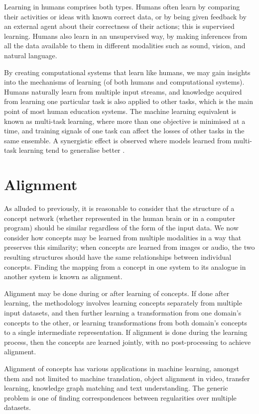 Learning in humans comprises both types. Humans often learn by comparing their activities or ideas with known correct data, or by being given feedback by an external agent about their correctness of their actions; this is supervised learning. Humans also learn in an unsupervised way, by making inferences from all the data available to them in different modalities such as sound, vision, and natural language. 

By creating computational systems that learn like humans, we may gain insights into the mechanisms of learning (of both humans and computational systems). Humans naturally learn from multiple input streams, and knowledge acquired from learning one particular task is also applied to other tasks, which is the main point of most human education systems. The machine learning equivalent is known as multi-task learning, where more than one objective is minimised at a time, and training signals of one task can affect the losses of other tasks in the same ensemble. A synergistic effect is observed where models learned from multi-task learning tend to generalise better \cite{OverviewMultiTaskLearning}.

\section{Alignment}

As alluded to previously, it is reasonable to consider that the structure of a concept network (whether represented in the human brain or in a computer program) should be similar regardless of the form of the input data. We now consider how concepts may be learned from multiple modalities in a way that preserves this similarity; when concepts are learned from images or audio, the two resulting structures should have the same relationships between individual concepts. Finding the mapping from a concept in one system to its analogue in another system is known as alignment. 

Alignment may be done during or after learning of concepts. If done after learning, the methodology involves learning concepts separately from multiple input datasets, and then further learning a transformation from one domain's concepts to the other, or learning transformations from both domain's concepts to a single intermediate representation. If alignment is done during the learning process, then the concepts are learned jointly, with no post-processing to achieve alignment. 

Alignment of concepts has various applications in machine learning, amongst them and not limited to machine translation, object alignment in video, transfer learning, knowledge graph matching and text understanding. The generic problem is one of finding correspondences between regularities over multiple datasets. 

